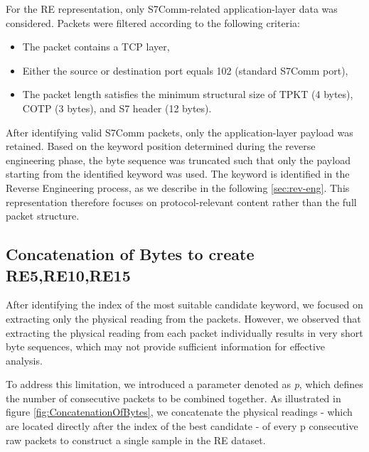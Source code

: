
For the \ac{RE} representation, only S7Comm-related
application-layer data was considered. Packets were filtered according
to the following criteria:

\begin{itemize}
    \item The packet contains a \ac{TCP} layer,
    \item Either the source or destination port equals 102 (standard S7Comm port),
    \item The packet length satisfies the minimum structural size of
          TPKT (4 bytes), COTP (3 bytes), and S7 header (12 bytes).
\end{itemize}

After identifying valid S7Comm packets, only the application-layer
payload was retained. Based on the keyword position determined during
the reverse engineering phase, the byte sequence was truncated such
that only the payload starting from the identified keyword was used.
The keyword is identified in the Reverse Engineering process, as we describe in the following \cref{sec:rev-eng}. 
This representation therefore focuses on protocol-relevant content
rather than the full packet structure.

\subsection{Concatenation of Bytes to create RE5,RE10,RE15}

After identifying the index of the most suitable candidate keyword, we focused on extracting only the physical reading from the packets. However, we observed that extracting the physical reading from each packet individually results in very short byte sequences, which may not provide sufficient information for effective analysis. 

To address this limitation, we introduced a parameter denoted as \textit{p}, which defines the number of consecutive packets to be combined together. As illustrated in figure \ref{fig:ConcatenationOfBytes}, we concatenate the physical readings - which are located directly after the index of the best candidate - of every p consecutive raw packets to construct a single sample in the \ac{RE} dataset. 

